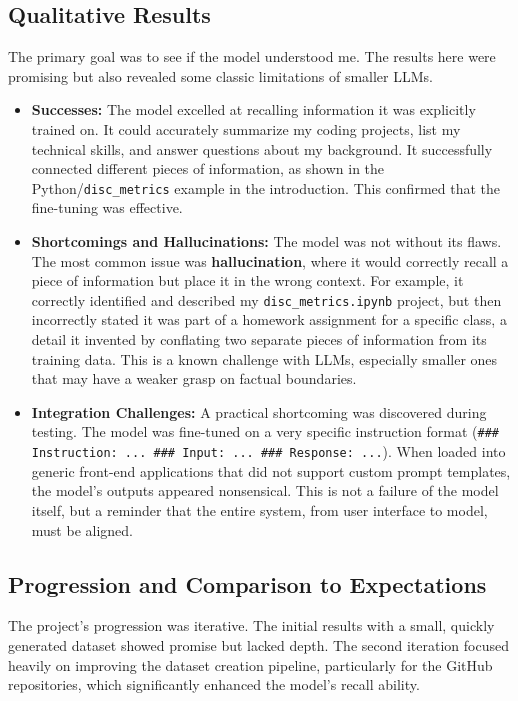 \documentclass[conference]{IEEEtran}
\begin{document}
\subsection{Qualitative Results}
The primary goal was to see if the model understood me. The results here were promising but also revealed some classic limitations of smaller LLMs.
\begin{itemize}
    \item \textbf{Successes:} The model excelled at recalling information it was explicitly trained on. It could accurately summarize my coding projects, list my technical skills, and answer questions about my background. It successfully connected different pieces of information, as shown in the Python/\texttt{disc\_metrics} example in the introduction. This confirmed that the fine-tuning was effective.
    \item \textbf{Shortcomings and Hallucinations:} The model was not without its flaws. The most common issue was \textbf{hallucination}, where it would correctly recall a piece of information but place it in the wrong context. For example, it correctly identified and described my \texttt{disc\_metrics.ipynb} project, but then incorrectly stated it was part of a homework assignment for a specific class, a detail it invented by conflating two separate pieces of information from its training data. This is a known challenge with LLMs, especially smaller ones that may have a weaker grasp on factual boundaries.
    \item \textbf{Integration Challenges:} A practical shortcoming was discovered during testing. The model was fine-tuned on a very specific instruction format (\texttt{\#\#\# Instruction: ... \#\#\# Input: ... \#\#\# Response: ...}). When loaded into generic front-end applications that did not support custom prompt templates, the model's outputs appeared nonsensical. This is not a failure of the model itself, but a reminder that the entire system, from user interface to model, must be aligned.
\end{itemize}

\subsection{Progression and Comparison to Expectations}
The project's progression was iterative. The initial results with a small, quickly generated dataset showed promise but lacked depth. The second iteration focused heavily on improving the dataset creation pipeline, particularly for the GitHub repositories, which significantly enhanced the model's recall ability.
\end{document}
